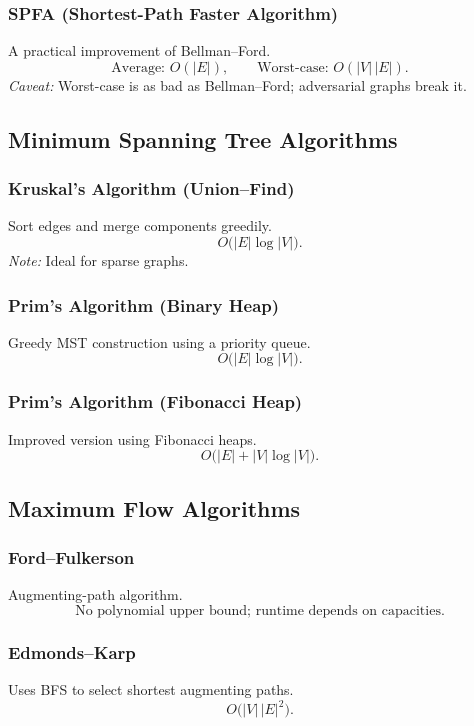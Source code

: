 \documentclass[9pt]{extarticle}
\begin{document}
\subsubsection{SPFA (Shortest-Path Faster Algorithm)}
A practical improvement of Bellman--Ford.
\[
\text{Average: } O(|E|), \qquad \text{Worst-case: } O(|V| \, |E|).
\]
\emph{Caveat:} Worst-case is as bad as Bellman--Ford; adversarial graphs break it.

\subsection{Minimum Spanning Tree Algorithms}

\subsubsection{Kruskal's Algorithm (Union--Find)}
Sort edges and merge components greedily.
\[
O\bigl(|E| \log |V|\bigr).
\]
\emph{Note:} Ideal for sparse graphs.

\subsubsection{Prim's Algorithm (Binary Heap)}
Greedy MST construction using a priority queue.
\[
O\bigl(|E| \log |V|\bigr).
\]

\subsubsection{Prim's Algorithm (Fibonacci Heap)}
Improved version using Fibonacci heaps.
\[
O\bigl(|E| + |V| \log |V|\bigr).
\]

\subsection{Maximum Flow Algorithms}

\subsubsection{Ford--Fulkerson}
Augmenting-path algorithm.
\[
\text{No polynomial upper bound;} \text{ runtime depends on capacities}.
\]

\subsubsection{Edmonds--Karp}
Uses BFS to select shortest augmenting paths.
\[
O\bigl(|V| \, |E|^{2}\bigr).
\]
\end{document}
